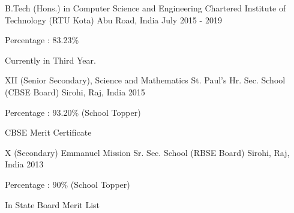 

\begin{cventries}

  \cventry
	  {B.Tech (Hons.) in Computer Science and Engineering}
	  {Chartered Institute of Technology (RTU Kota)}
	  {Abu Road, India}
	  {July 2015 - 2019}
	  {
	  	\begin{cvitems}
	  		\item {Percentage : 83.23\%}
	  		\item {Currently in Third Year.}
	  	\end{cvitems}
	  }
  
  \cventry
	  {XII (Senior Secondary), Science and Mathematics}
	  {St. Paul's Hr. Sec. School (CBSE Board)}
	  {Sirohi, Raj, India}
	  {2015}
	  {
	  	\begin{cvitems}
	  		\item {Percentage : 93.20\% (School Topper)}
	  		\item {CBSE Merit Certificate}
	  	\end{cvitems}
	  }
  
  \cventry
	  {X (Secondary)}
	  {Emmanuel Mission Sr. Sec. School (RBSE Board)}
	  {Sirohi, Raj, India}
	  {2013}
	  {
	  	\begin{cvitems}
	  		\item {Percentage : 90\% (School Topper)}
	  		\item {In State Board Merit List}
	  	\end{cvitems}
	  }
\end{cventries}
